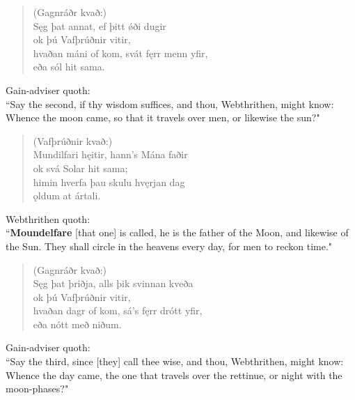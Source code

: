 \begin{verse}
(Gagnráðr kvað:) \\%
\bva Sęg þat annat, \hld ef þitt ǿði dugir \\%
\ind ok þú Vafþrúðnir vitir, \\%
hvaðan máni of kom, \hld svát fęrr menn yfir, \\%
\ind eða sól hit sama.\\%
\end{verse}

\bvb Gain-adviser quoth: \\ “Say the second, if thy wisdom suffices, and thou, Webthrithen, might know: Whence the moon came, so that it travels over men, or likewise the sun?" \\

\begin{verse}
(Vafþrúðnir kvað:) \\%
\bva Mundilfari hęitir, \hld hann's Mána faðir \\%
\ind ok svá Solar hit sama; \\%
himin hverfa \hld þau skulu hvęrjan dag \\%
\ind ǫldum at ártali.\\%
\end{verse}

\bvb Webthrithen quoth: \\ “\textbf{Moundelfare} [that one] is called, he is the father of the Moon, and likewise of the Sun. They shall circle in the heavens every day, for men to reckon time\footnotemark[40]." \\

\begin{verse}
(Gagnráðr kvað:) \\%
\bva Sęg þat þriðja, \hld alls þik svinnan kveða \\%
\ind ok þú Vafþrúðnir vitir, \\%
hvaðan dagr of kom, \hld sá's fęrr drótt yfir, \\%
\ind eða nótt með niðum.\\%
\end{verse}

\bvb Gain-adviser quoth: \\ “Say the third, since [they] call thee wise, and thou, Webthrithen, might know: Whence the day came, the one that travels over the rettinue, or night with the moon-phases?" \\

